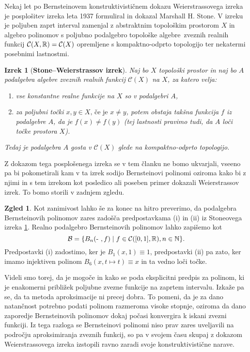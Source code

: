\documentclass[a4paper, reqno]{amsart}
\theoremstyle{theorem}
\newtheorem{izrek}{Izrek}[section]
\theoremstyle{definition}
\newtheorem*{zgled*}{Zgled}
\begin{document}
\par
Nekaj let po Bernsteinovem konstruktivističnem dokazu Weierstrassovega
izreka je posplošitev izreka leta 1937 formuliral in dokazal
Marshall H. Stone. V izreku je poljuben zaprt interval zamenjal z abstraktnim
topološkim prostorom $X$ in algebro polinomov s poljubno podalgebro
topološke algebre zveznih realnih funkcij $\mathcal{C}(X, \mathbb{R}) = \mathcal{C}(X)$
opremljene s
kompaktno-odprto topologijo ter nekatermi posebnimi lastnostmi.

\renewcommand{\labelenumi}{(\roman{enumi})}

\begin{izrek}[\textbf{Stone--Weierstrassov izrek}]
	\label{Stone}\cite[Izrek 4.28]{MrcunTop}
	Naj bo $X$ topološki prostor in naj bo $A$ podalgebra algebre zveznih
	realnih funkcij $\mathcal{C}(X)$ na $X$, za katero velja:
	\begin{enumerate}
		\item vse konstantne realne funkcije na $X$ so v podalgebri $A$,
		\item za poljubni točki $x, y \in X\text{, če je } x \neq y$, potem obstaja takšna
		funkcija $f$ iz podalgebre $A$, da je $f(x) \neq f(y)$ (tej
		lastnosti pravimo tudi, da $A$ loči točke prostora $X$). 
	\end{enumerate}
	Tedaj je podalgebra $A$ gosta v $\mathcal{C}(X)$ glede na kompaktno-odprto
	topologijo. 
\end{izrek}

\par
Z dokazom tega posplošenega izreka se v tem članku ne bomo ukvarjali, vseeno
pa bi pokometirali kam v ta izrek sodijo Bernsteinovi polinomi oziroma kako
bi z njimi in s tem izrekom kot posledico ali poseben primer dokazali 
Weierstrassov izrek. To bomo storili v zadnjem zgledu.

\begin{zgled*}
	Kot zanimivost lahko še za konec na hitro preverimo, da podalgebra Bernsteinovih
	polinomov zares zadošča predpostavkama (i) in (ii) iz Stoneovega izreka 
	\ref{Stone}. Realno podalgebro Bernsteinovih polinomov lahko zapišemo kot
	$$
	\mathcal{B} = \{B_n(\text{- }, f) \mid f \in \mathcal{C}([0,1],\mathbb{R}), n \in \mathbb{N}\}\text{.}
	$$
	Predpostavki (i) zadostimo, ker je $B_1(x, 1) \equiv 1$, predpostavki (ii) pa zato,
	ker imamo injektiven polinom $B_6(x, t \mapsto t) \equiv x$ in ta vedno loči točke.
\end{zgled*}

\par
Videli smo torej, da je mogoče in kako se poda eksplicitni predpis za polinom, ki je 
enakomerni približek poljubne zvezne funkcije na zaprtem intervalu. Izkaže pa se, da
ta metoda aproksimacije ni precej dobra. To pomeni, da je za dano natančnost potrebno
podati polinom razmeroma visoke stopnje, oziroma da dano zaporedje Bernsteinovih
polinomov dokaj počasi konvergira k iskani zvezni funkciji. Iz tega razloga se 
Bernsteinovi polinomi niso prav zares uveljavili na področju aproksimiranja zveznih 
funkcij, so pa v svojem času skupaj z dokazom Weierstrassovega izreka izstopili 
ravno zaradi svoje konstruktivistične narave.  

\nocite{*}
\newpage



\end{document}
